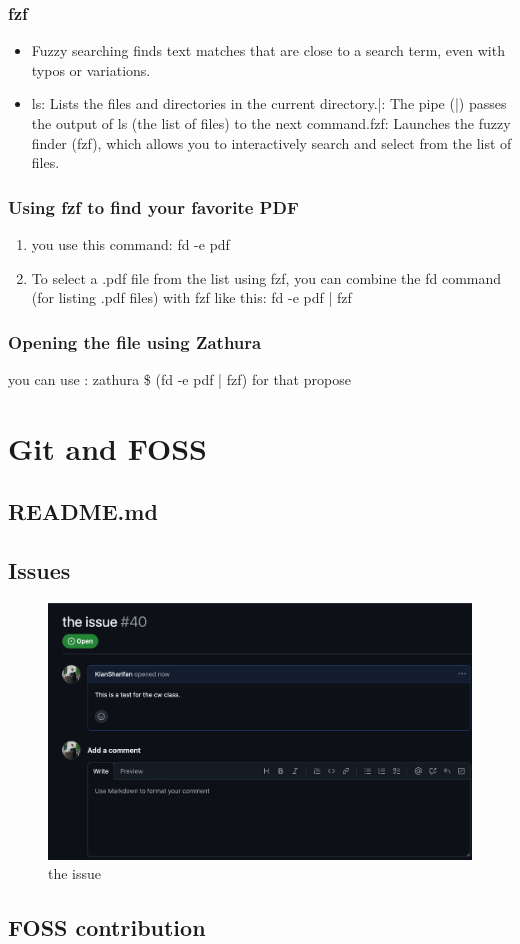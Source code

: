 \documentclass{article}
\begin{document}
\subsubsection{fzf}
\begin{itemize}
    \item Fuzzy searching finds text matches that are close to a search term, even with typos or variations.
    \item ls: Lists the files and directories in the current directory.\newline|: The pipe (|) passes the output of ls (the list of files) to the next command.\newline fzf: Launches the fuzzy finder (fzf), which allows you to interactively search and select from the list of files.
\end{itemize}
\newpage
\subsubsection{Using fzf to find your favorite PDF}
\begin{enumerate}
    \item you use this command: fd -e pdf
    \item To select a .pdf file from the list using fzf, you can combine the fd command (for listing .pdf files) with fzf like this: fd -e pdf | fzf
\end{enumerate}
\subsubsection{Opening the file using Zathura}
you can use : zathura \$ (fd -e pdf | fzf) for that propose

\section{Git and FOSS}
\subsection{README.md}
\subsection{Issues}
\begin{figure}[h]
    \centering
    \includegraphics[width=0.75\linewidth]{pic.png}
    \caption{the issue}
    \label{fig:enter-label}
\end{figure}
\subsection{FOSS contribution}
\end{document}
